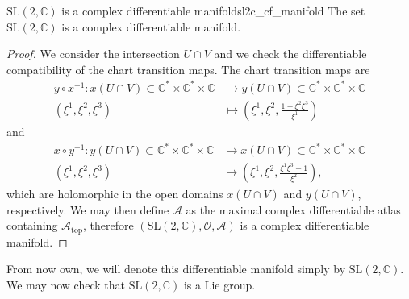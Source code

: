 \begin{proposition}{\(\mathrm{SL}(2, \mathbb{C})\) is a complex differentiable manifold}{sl2c_cf_manifold}
    The set \(\mathrm{SL}(2, \mathbb{C})\) is a complex differentiable manifold.
\end{proposition}
\begin{proof}
    We consider the intersection \(U \cap V\) and we check the differentiable compatibility of the chart transition maps. The chart transition maps are
    \begin{align*}
        y \circ x^{-1} : x(U\cap V) \subset \mathbb{C}^{\ast}\times \mathbb{C}^{\ast} \times \mathbb{C} &\to y(U\cap V) \subset \mathbb{C}^{\ast} \times \mathbb{C}^{\ast} \times \mathbb{C}\\
        (\xi^1, \xi^2, \xi^3) &\mapsto \left(\xi^1, \xi^2,\frac{1 +  \xi^2 \xi^3}{\xi^1}\right)
    \end{align*}
    and
    \begin{align*}
        x \circ y^{-1} : y(U\cap V) \subset \mathbb{C}^{\ast}\times \mathbb{C}^{\ast} \times \mathbb{C} &\to x(U\cap V) \subset \mathbb{C}^{\ast} \times \mathbb{C}^{\ast} \times \mathbb{C}\\
        (\xi^1, \xi^2, \xi^3) &\mapsto \left(\xi^1, \xi^2,\frac{\xi^1 \xi^3-1}{\xi^2}\right),
    \end{align*}
    which are holomorphic in the open domains \(x(U\cap V)\) and \(y(U\cap V)\), respectively. We may then define \(\mathscr{A}\) as the maximal complex differentiable atlas containing \(\mathscr{A}_{\mathrm{top}}\), therefore \((\mathrm{SL}(2,\mathbb{C}), \mathcal{O}, \mathscr{A})\) is a complex differentiable manifold.
\end{proof}

From now own, we will denote this differentiable manifold simply by \(\mathrm{SL}(2, \mathbb{C})\). We may now check that \(\mathrm{SL}(2, \mathbb{C})\) is a Lie group.

